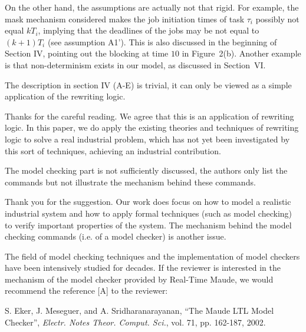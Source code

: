 \documentclass[10pt,journal]{IEEEtran}
\newcommand{\hide}[1]{\ignorespaces}
\newcommand{\ANSWER}{\medskip\noindent{\bf RESPONSE: }}
\newcommand{\COMMENT}{\medskip\noindent{\bf COMMENT: }}
\begin{document}
On the other hand, the assumptions are actually not that rigid. For
example, the mask mechanism considered makes the job initiation times
of task $\tau_i$ possibly not equal $kT_i$, implying that the
deadlines of the jobs may be not equal to $(k+1)T_i$ (see assumption
A1'). This is also discussed in the beginning of Section IV, pointing
out the blocking at time $10$ in Figure~2(b). Another example is that
non-determinism exists in our model, as discussed in Section~VI.

\COMMENT 

The description in section IV (A-E) is trivial, it can only be viewed
as a simple application of the rewriting logic.

\ANSWER 

Thanks for the careful reading. We agree that this is an application
of rewriting logic. In this paper, we do apply the existing theories
and techniques of rewriting logic to solve a real industrial problem,
which has not yet been investigated by this sort of techniques,
achieving an industrial contribution.

\COMMENT 

The model checking part is not sufficiently discussed, the authors
only list the commands but not illustrate the mechanism behind these
commands.

\ANSWER 

Thank you for the suggestion. Our work does focus on how to model a
realistic industrial system and how to apply formal techniques (such
as model checking) to verify important properties of the system. The
mechanism behind the model checking commands (i.e. of a model checker)
is another issue.

The field of model checking techniques and the implementation of model
checkers have been intensively studied for decades. If the reviewer is
interested in the mechanism of the model checker provided by Real-Time
Maude, we would recommend the reference [A] to the reviewer:

\noindent
[A] S. Eker, J. Meseguer, and A. Sridharanarayanan, ``The Maude LTL
Model Checker'', {\it Electr. Notes Theor. Comput. Sci.}, vol. 71,
pp. 162-187, 2002.

\hide{
However, since the model checker is not part of our contributions in
the paper, we do not think it is appropriate to illustrate the
mechanism behind the model checking commands, which may confuse the
readers on the other hand.}


\hide{
\ifCLASSOPTIONcompsoc
  \section*{Acknowledgments}
\else
  \section*{Acknowledgment}
\fi

The authors would like to thank...
}
\end{document}

